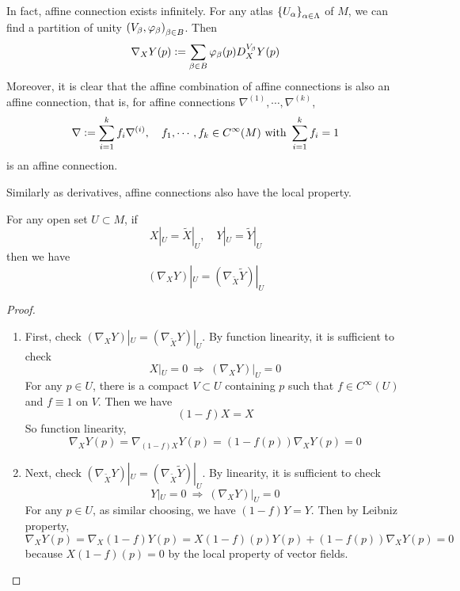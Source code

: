 \begin{rmk}
	In fact, affine connection exists infinitely. For any atlas $\left\{U_\alpha\right\}_{\alpha \in \Lambda}$ of $M$, we can find a partition of unity $\left(V_\beta,\varphi_\beta\right)_{\beta \in B}$. Then
	\begin{equation*}
		\nabla_XY(p) \vcentcolon= \sum_{\beta \in B} \varphi_\beta(p) D_X^{V_\beta} Y(p)
	\end{equation*}
	Moreover, it is clear that the affine combination of affine connections is also an affine connection, that is, for affine connections $\nabla^{(1)},\cdots,\nabla^{(k)}$,
	\begin{equation*}
		\nabla \vcentcolon= \sum_{i=1}^{k} f_i\nabla^{(i)},\quad f_1,\cdots,f_k \in C^\infty(M) \text{ with } \sum_{i=1}^kf_i = 1
	\end{equation*}
	is an affine connection.
\end{rmk}

\noindent Similarly as derivatives, affine connections also have the local property.
\begin{prop}
	For any open set $U \subset M$, if
	\begin{equation*}
		X|_U = \tilde{X}|_U,\quad Y|_U = \tilde{Y}|_U
	\end{equation*}
	then we have
	\begin{equation*}
		(\nabla_XY)|_U = (\nabla_{\tilde{X}}\tilde{Y})|_U
	\end{equation*}
\end{prop}
\begin{proof}
	\begin{enumerate}[label=(\arabic{*})]
		\item First, check $(\nabla_XY)|_U = (\nabla_{\tilde{X}}Y)|_U$. By function linearity, it is sufficient to check
		\begin{equation*}
			X|_U = 0 ~\Rightarrow~ (\nabla_XY)|_U = 0
		\end{equation*}
		For any $p \in U$, there is a compact $V \subset U$ containing $p$ such that $f \in C^\infty(U)$ and $f \equiv 1$ on $V$. Then we have
		\begin{equation*}
			(1-f)X = X
		\end{equation*}
		So function linearity,
		\begin{equation*}
			\nabla_XY(p) = \nabla_{(1-f)X}Y(p) = (1-f(p))\nabla_XY(p) = 0
		\end{equation*}

		\item Next, check $(\nabla_{\tilde{X}}Y)|_U = (\nabla_{\tilde{X}}\tilde{Y})|_U$. By linearity, it is sufficient to check
		\begin{equation*}
			Y|_U = 0 ~\Rightarrow~ (\nabla_XY)|_U = 0
		\end{equation*}
		For any $p \in U$, as similar choosing, we have $(1-f)Y = Y$. Then by Leibniz property,
		\begin{equation*}
			\nabla_XY(p) = \nabla_X(1-f)Y(p) = X(1-f)(p)Y(p) + (1-f(p))\nabla_XY(p) = 0
		\end{equation*}
		because $X(1-f)(p) = 0$ by the local property of vector fields. \qedhere
	\end{enumerate}
\end{proof}


